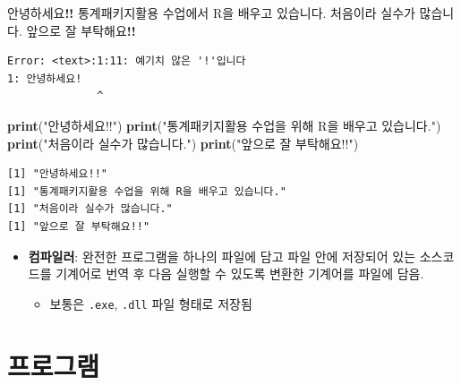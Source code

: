 \documentclass[
  11pt,
]{krantz}
\newenvironment{Shaded}{\begin{snugshade}}{\end{snugshade}}
\newcommand{\KeywordTok}[1]{\textcolor[rgb]{0.27,0.27,0.27}{\textbf{#1}}}
\newcommand{\NormalTok}[1]{#1}
\newcommand{\OperatorTok}[1]{\textcolor[rgb]{0.43,0.43,0.43}{\textbf{#1}}}
\newcommand{\StringTok}[1]{\textcolor[rgb]{0.5,0.5,0.5}{#1}}
\providecommand{\tightlist}{%
  \setlength{\itemsep}{0pt}\setlength{\parskip}{0pt}}
\begin{document}
\footnotesize

\begin{Shaded}
\begin{Highlighting}[]
\NormalTok{안녕하세요}\OperatorTok{!!}
\NormalTok{통계패키지활용 수업에서 R을 배우고 있습니다. }
\NormalTok{처음이라 실수가 많습니다.}
\NormalTok{앞으로 잘 부탁해요}\OperatorTok{!!}
\end{Highlighting}
\end{Shaded}

\begin{verbatim}
Error: <text>:1:11: 예기치 않은 '!'입니다
1: 안녕하세요!
              ^
\end{verbatim}

\normalsize

\footnotesize

\begin{Shaded}
\begin{Highlighting}[]
\KeywordTok{print}\NormalTok{(}\StringTok{"안녕하세요!!"}\NormalTok{)}
\KeywordTok{print}\NormalTok{(}\StringTok{"통계패키지활용 수업을 위해 R을 배우고 있습니다."}\NormalTok{)}
\KeywordTok{print}\NormalTok{(}\StringTok{"처음이라 실수가 많습니다."}\NormalTok{)}
\KeywordTok{print}\NormalTok{(}\StringTok{"앞으로 잘 부탁해요!!"}\NormalTok{)}
\end{Highlighting}
\end{Shaded}

\begin{verbatim}
[1] "안녕하세요!!"
[1] "통계패키지활용 수업을 위해 R을 배우고 있습니다."
[1] "처음이라 실수가 많습니다."
[1] "앞으로 잘 부탁해요!!"
\end{verbatim}

\normalsize

\begin{itemize}
\tightlist
\item
  \textbf{컴파일러}: 완전한 프로그램을 하나의 파일에 담고 파일 안에 저장되어 있는 소스코드를 기계어로 번역 후 다음 실행할 수 있도록 변환한 기계어를 파일에 담음.

  \begin{itemize}
  \tightlist
  \item
    보통은 \texttt{.exe}, \texttt{.dll} 파일 형태로 저장됨
  \end{itemize}
\end{itemize}

\hypertarget{control-program}{%
\section{프로그램}\label{control-program}}
\end{document}
